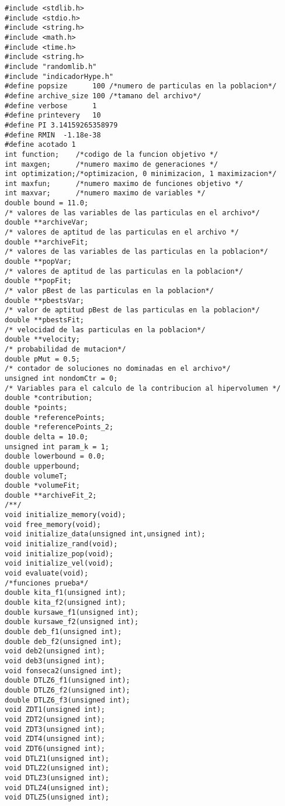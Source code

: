 \noindent
  \begin{lstlisting}[style=C]
#include <stdlib.h>
#include <stdio.h>
#include <string.h>
#include <math.h>
#include <time.h>
#include <string.h>
#include "randomlib.h"
#include "indicadorHype.h"
#define popsize      100 /*numero de particulas en la poblacion*/
#define archive_size 100 /*tamano del archivo*/
#define verbose      1
#define printevery   10
#define PI 3.14159265358979
#define RMIN  -1.18e-38
#define acotado 1
int function;    /*codigo de la funcion objetivo */
int maxgen;      /*numero maximo de generaciones */
int optimization;/*optimizacion, 0 minimizacion, 1 maximizacion*/
int maxfun;      /*numero maximo de funciones objetivo */
int maxvar;      /*numero maximo de variables */
double bound = 11.0;
/* valores de las variables de las particulas en el archivo*/
double **archiveVar; 
/* valores de aptitud de las particulas en el archivo */
double **archiveFit; 
/* valores de las variables de las particulas en la poblacion*/
double **popVar;     
/* valores de aptitud de las particulas en la poblacion*/
double **popFit;     
/* valor pBest de las particulas en la poblacion*/
double **pbestsVar;  
/* valor de aptitud pBest de las particulas en la poblacion*/
double **pbestsFit;  
/* velocidad de las particulas en la poblacion*/
double **velocity;   
/* probabilidad de mutacion*/
double pMut = 0.5;   
/* contador de soluciones no dominadas en el archivo*/
unsigned int nondomCtr = 0;  
/* Variables para el calculo de la contribucion al hipervolumen */
double *contribution;
double *points;
double *referencePoints;
double *referencePoints_2;
double delta = 10.0;
unsigned int param_k = 1;
double lowerbound = 0.0;
double upperbound;
double volumeT;
double *volumeFit;
double **archiveFit_2;
/**/
void initialize_memory(void);
void free_memory(void);
void initialize_data(unsigned int,unsigned int);
void initialize_rand(void);
void initialize_pop(void);
void initialize_vel(void);
void evaluate(void);
/*funciones prueba*/
double kita_f1(unsigned int);
double kita_f2(unsigned int);
double kursawe_f1(unsigned int);
double kursawe_f2(unsigned int);
double deb_f1(unsigned int);
double deb_f2(unsigned int);
void deb2(unsigned int);
void deb3(unsigned int);
void fonseca2(unsigned int);
double DTLZ6_f1(unsigned int);
double DTLZ6_f2(unsigned int);
double DTLZ6_f3(unsigned int);
void ZDT1(unsigned int);
void ZDT2(unsigned int);
void ZDT3(unsigned int);
void ZDT4(unsigned int);
void ZDT6(unsigned int);
void DTLZ1(unsigned int);
void DTLZ2(unsigned int);
void DTLZ3(unsigned int);
void DTLZ4(unsigned int);
void DTLZ5(unsigned int);

\end{lstlisting}
